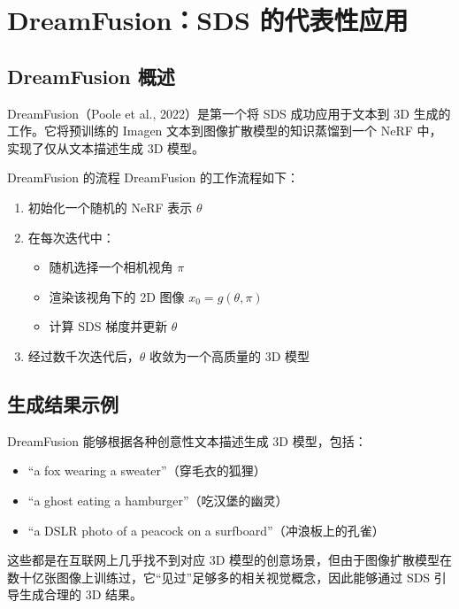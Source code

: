 \section{DreamFusion：SDS 的代表性应用}

\subsection{DreamFusion 概述}

DreamFusion（Poole et al., 2022）是第一个将 SDS 成功应用于文本到 3D 生成的工作。它将预训练的 Imagen 文本到图像扩散模型的知识蒸馏到一个 NeRF 中，实现了仅从文本描述生成 3D 模型。

\begin{importantbox}{DreamFusion 的流程}
DreamFusion 的工作流程如下：
\begin{enumerate}
    \item 初始化一个随机的 NeRF 表示 $\theta$
    \item 在每次迭代中：
    \begin{itemize}
        \item 随机选择一个相机视角 $\pi$
        \item 渲染该视角下的 2D 图像 $x_0 = g(\theta, \pi)$
        \item 计算 SDS 梯度并更新 $\theta$
    \end{itemize}
    \item 经过数千次迭代后，$\theta$ 收敛为一个高质量的 3D 模型
\end{enumerate}
\end{importantbox}

\subsection{生成结果示例}

DreamFusion 能够根据各种创意性文本描述生成 3D 模型，包括：
\begin{itemize}
    \item ``a fox wearing a sweater''（穿毛衣的狐狸）
    \item ``a ghost eating a hamburger''（吃汉堡的幽灵）
    \item ``a DSLR photo of a peacock on a surfboard''（冲浪板上的孔雀）
\end{itemize}

这些都是在互联网上几乎找不到对应 3D 模型的创意场景，但由于图像扩散模型在数十亿张图像上训练过，它``见过''足够多的相关视觉概念，因此能够通过 SDS 引导生成合理的 3D 结果。

